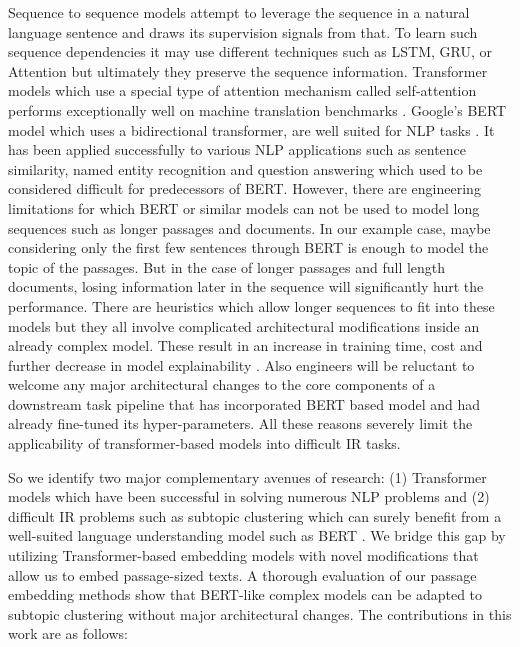 Sequence to sequence models attempt to leverage the sequence in a natural language sentence and draws its supervision signals from that. To learn such sequence dependencies it may use different techniques such as LSTM, GRU, or Attention \cite{hochreiter1997long, cho2014learning, vaswani2017attention} but ultimately they preserve the sequence information. Transformer models which use a special type of attention mechanism called self-attention performs exceptionally well on machine translation benchmarks \cite{raganato2018analysis}. Google's BERT model which uses a bidirectional transformer, are well suited for NLP tasks \cite{devlin2018bert}. It has been applied successfully to various NLP applications such as sentence similarity, named entity recognition and question answering \cite{yang2019end, miftahutdinov2020biomedical} which used to be considered difficult for predecessors of BERT. However, there are engineering limitations for which BERT or similar models can not be used to model long sequences such as longer passages and documents. In our example case, maybe considering only the first few sentences through BERT is enough to model the topic of the passages. But in the case of longer passages and full length documents, losing information later in the sequence will significantly hurt the performance. There are heuristics which allow longer sequences to fit into these models but they all involve complicated architectural modifications inside an already complex model. These result in an increase in training time, cost and further decrease in model explainability .  Also engineers will be reluctant to welcome any major architectural changes to the core components of a downstream task pipeline that has incorporated BERT based model and had already fine-tuned its hyper-parameters. All these reasons severely limit the applicability of transformer-based models into difficult IR tasks.

So we identify two major complementary avenues of research:  (1) Transformer models which have been successful in solving numerous NLP problems and (2) difficult IR problems such as subtopic clustering which can surely benefit from a well-suited language understanding model such as BERT . We bridge this gap  by utilizing Transformer-based embedding models with novel  modifications that allow us to embed passage-sized texts. A thorough evaluation of our passage embedding methods show that BERT-like complex models can be adapted to  subtopic clustering without major architectural changes. The contributions in this work are as follows:

